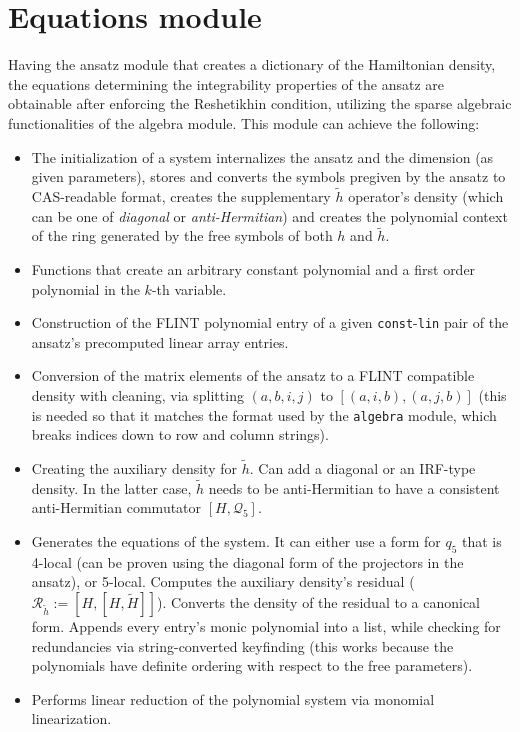 \documentclass[a4paper, 11pt, twoside, onecolumn]{article}
\newcommand{\Q}{\mathcal{Q}}
\newcommand{\htil}{\tilde{h}}
\begin{document}
\section{Equations module}
Having the ansatz module that creates a dictionary of the Hamiltonian density, the equations determining the integrability properties of the ansatz are obtainable after enforcing the Reshetikhin condition, utilizing the sparse algebraic functionalities of the algebra module. This module can achieve the following:
\begin{itemize}
    \item The initialization of a system internalizes the ansatz and the dimension (as given parameters), stores and converts the symbols pregiven by the ansatz to CAS-readable format, creates the supplementary $\htil$ operator's density (which can be one of \textit{diagonal} or \textit{anti-Hermitian}) and creates the polynomial context of the ring generated by the free symbols of both $h$ and $\htil$.
    \item Functions that create an arbitrary constant polynomial and a first order polynomial in the $k$-th variable.
    \item Construction of the FLINT polynomial entry of a given \texttt{const}-\texttt{lin} pair of the ansatz's precomputed linear array entries.
    \item Conversion of the matrix elements of the ansatz to a FLINT compatible density with cleaning, via splitting $(a,b,i,j)$ to $[(a,i,b),(a,j,b)]$ (this is needed so that it matches the format used by the \texttt{algebra} module, which breaks indices down to row and column strings).
    \item Creating the auxiliary density for $\htil$. Can add a diagonal or an IRF-type density. In the latter case, $\htil$ needs to be anti-Hermitian to have a consistent anti-Hermitian commutator $[H,\Q_5]$.
    \item Generates the equations of the system. It can either use a form for $q_5$ that is 4-local (can be proven using the diagonal form of the projectors in the ansatz), or 5-local. Computes the auxiliary density's residual ($\mathcal{R}_{\tilde{h}}:=[H,[H,\tilde{H}]]$). Converts the density of the residual to a canonical form. Appends every entry's monic polynomial into a list, while checking for redundancies via string-converted keyfinding (this works because the polynomials have definite ordering with respect to the free parameters).
    \item Performs linear reduction of the polynomial system via monomial linearization.
\end{itemize}
\end{document}
